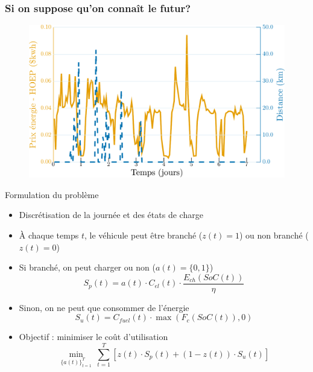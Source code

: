 \documentclass[french]{beamer}
\begin{document}
{\begin{frame}
\frametitle{Si on suppose qu'on connaît le futur?}
\begin{center}
\begin{figure}
\includegraphics[width=\linewidth]{PriceDist_201Fr.pdf}
\end{figure} 
 \end{center}
\end{frame}

\begin{frame}{Formulation du problème}

\begin{itemize}
	\item Discrétisation de la journée et des états de charge
	\item À chaque temps $t$, le véhicule peut être branché ($z(t)=1$) ou non branché ($z(t)=0$)
	\item Si branché, on peut charger ou non ($a(t) = \{0, 1\}$)
\begin{equation}\label{eq:costp1}
S_p(t) = a(t) \cdot C_{el}(t) \cdot \frac{E_{ch}(SoC(t))}{\eta}
\end{equation}
	\item Sinon, on ne peut que consommer de l'énergie
\begin{equation}\label{eq:costp2}
S_u(t) = C_{fuel}(t) \cdot \max(F_{c}(SoC(t)),0)
\end{equation}
	\item Objectif : minimiser le coût d'utilisation
\begin{equation}
\min_{\{a(t)\}_{t=1}^T}~\sum_{t=1}^{T} \left[z(t) \cdot S_p(t) + (1-z(t)) \cdot S_u(t)\right]
\label{eq:cost}
\end{equation}
\end{itemize}


\end{frame}}
\end{document}
